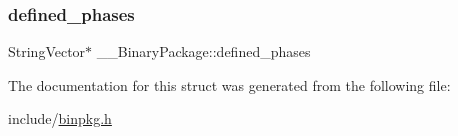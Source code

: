 \mbox{\label{struct_____binary_package_a11c329473ddc741710911d6444115c8c}} 
\subsubsection{\texorpdfstring{defined\+\_\+phases}{defined\_phases}}
{\footnotesize\ttfamily String\+Vector$\ast$ \+\_\+\+\_\+\+Binary\+Package\+::defined\+\_\+phases}



The documentation for this struct was generated from the following file\+:\begin{DoxyCompactItemize}
\item 
include/\mbox{\hyperlink{binpkg_8h}{binpkg.\+h}}\end{DoxyCompactItemize}
